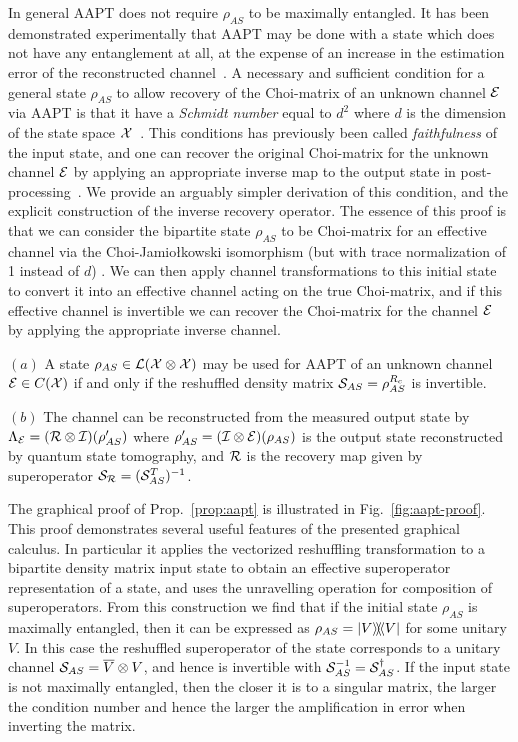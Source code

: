 In general AAPT does not require $\rho_{AS}$ to be maximally entangled. It has been demonstrated experimentally that AAPT may be done with a state which does not have any entanglement at all, at the expense of an increase in the estimation error of the reconstructed channel~\cite{White2003}. A necessary and sufficient condition for a general state $\rho_{AS}$ to allow recovery of the Choi-matrix of an unknown channel ${\cal E}$ via AAPT is that it have a \emph{Schmidt number} equal to $d^2$ where $d$ is the dimension of the state space ${\cal X}$~\cite{White2003}. This conditions has previously been called \emph{faithfulness} of the input state, and one can recover the original Choi-matrix for the unknown channel ${\cal E}$ by applying an appropriate inverse map to the output state in post-processing~\cite{DAriano2003}. We provide an arguably simpler derivation of this condition, and the explicit construction of the inverse recovery operator. The essence of this proof is that we can consider the bipartite state $\rho_{AS}$ to be Choi-matrix for an effective channel via the Choi-Jamio{\l}kowski isomorphism (but with trace normalization of 1 instead of $d$) . We can then apply channel transformations to this initial state to convert it into an effective channel acting on the true Choi-matrix, and if this effective channel is invertible we can recover the Choi-matrix for the channel ${\cal E}$ by applying the appropriate inverse channel.

\begin{proposition}
\label{prop:aapt}
$(a)$ A state $\rho_{AS}\in {\mathcal L}({\cal X}\otimes{\cal X})$ may be used for AAPT of an unknown channel ${\cal E}\in  C({\cal X})$ if and only if the reshuffled density matrix ${\cal S}_{AS} = \rho_{AS}^{R_c}$ is invertible. 

$(b)$ The channel can be reconstructed from the measured output state by $\Lambda_{{\cal E}} = ({\cal R}\otimes {\cal I})(\rho_{AS}^\prime)$
where $\rho_{AS}^\prime = ({\cal I}\otimes {\cal E})(\rho_{AS})$ is the output state reconstructed by quantum state tomography, and ${\cal R}$ is the recovery map given by superoperator ${\cal S}_{{\cal R}} = ({\cal S}_{AS}^T)^{-1}$.
\end{proposition}

The graphical proof of Prop.~\ref{prop:aapt}  is illustrated in Fig.~\ref{fig:aapt-proof}. This proof demonstrates several useful features of the presented graphical calculus. In particular it applies the vectorized reshuffling transformation to a bipartite density matrix input state to obtain an effective superoperator representation of a state, and uses the unravelling operation for composition of superoperators.
From this construction we find that if the initial state $\rho_{AS}$ is maximally entangled, then it can be expressed as $\rho_{AS}= \mbox{$|V\rangle\!\rangle\!\!\langle\!\langle V|$}$ for some unitary $V$. In this case the reshuffled superoperator of the state corresponds to a unitary channel ${\cal S}_{AS} = \overline{V}\otimes V$, and hence is invertible with ${\cal S}_{AS}^{-1} = {\cal S}_{AS}^\dagger$. If the input state is not maximally entangled, then the closer it is to a singular matrix, the larger the condition number and hence the larger the amplification in error when inverting the matrix.

